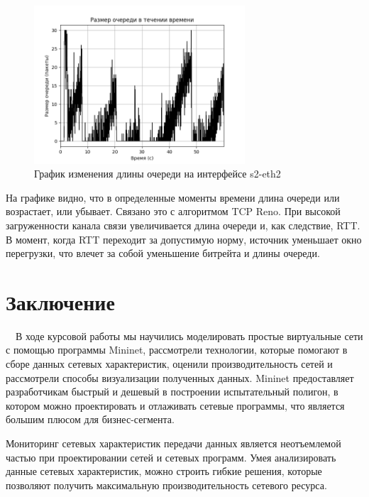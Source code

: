 \documentclass[
  13pt,
  fontsize=13pt,
  russian,
  a4paper,
,captions=tableheading
]{scrreprt}
\begin{document}
\begin{figure}
\hypertarget{fig:0037}{%
\centering
\includegraphics[width=0.7\textwidth,height=\textheight]{iproute_queue_len.png}
\caption{График изменения длины очереди на интерфейсе
s2-eth2}\label{fig:0037}
}
\end{figure}

На графике видно, что в определенные моменты времени длина очереди или
возрастает, или убывает. Связано это с алгоритмом TCP Reno. При высокой
загруженности канала связи увеличивается длина очереди и, как следствие,
RTT. В момент, когда RTT переходит за допустимую норму, источник
уменьшает окно перегрузки, что влечет за собой уменьшение битрейта и
длины очереди.

\hypertarget{ux437ux430ux43aux43bux44eux447ux435ux43dux438ux435}{%
\chapter*{Заключение}\label{ux437ux430ux43aux43bux44eux447ux435ux43dux438ux435}}

\(\quad\)В ходе курсовой работы мы научились моделировать простые
виртуальные сети с помощью программы Mininet, рассмотрели технологии,
которые помогают в сборе данных сетевых характеристик, оценили
производительность сетей и рассмотрели способы визуализации полученных
данных. Mininet предоставляет разработчикам быстрый и дешевый в
построении испытательный полигон, в котором можно проектировать и
отлаживать сетевые программы, что является большим плюсом для
бизнес-сегмента.

Мониторинг сетевых характеристик передачи данных является неотъемлемой
частью при проектировании сетей и сетевых программ. Умея анализировать
данные сетевых характеристик, можно строить гибкие решения, которые
позволяют получить максимальную производительность сетевого ресурса.
\end{document}

